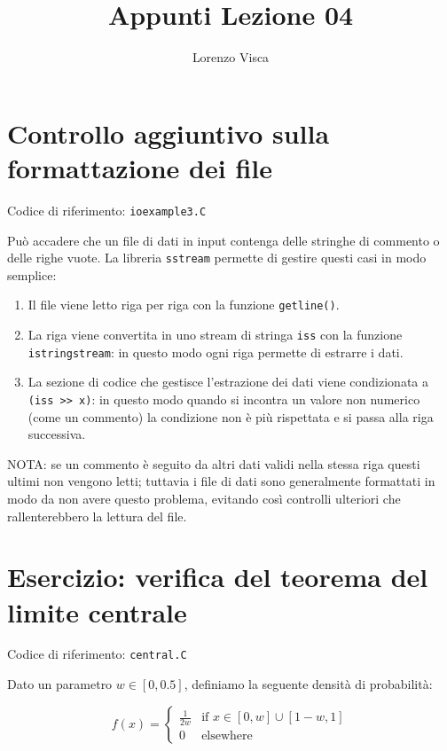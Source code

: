 \documentclass[10pt]{article}
\title{Appunti Lezione 04}
\author{Lorenzo Visca}
\date{}
\newcommand{\ttt}{\texttt}
\begin{document}
\maketitle

\section{Controllo aggiuntivo sulla formattazione dei file}
Codice di riferimento: \ttt{ioexample3.C} \vspace{10pt}

Può accadere che un file di dati in input contenga delle stringhe di commento o delle righe vuote.
La libreria \ttt{sstream} permette di gestire questi casi in modo semplice:

\begin{enumerate}
    \item Il file viene letto riga per riga con la funzione \ttt{getline()}.
    \item La riga viene convertita in uno stream di stringa \ttt{iss} con la funzione \ttt{istringstream}: in questo modo ogni riga permette di estrarre i dati.
    \item La sezione di codice che gestisce l'estrazione dei dati viene condizionata a \ttt{(iss >> x)}: in questo modo
          quando si incontra un valore non numerico (come un commento) la condizione non è più rispettata e si passa alla riga successiva.
    
\end{enumerate}

NOTA: se un commento è seguito da altri dati validi nella stessa riga questi ultimi non vengono letti;
tuttavia i file di dati sono generalmente formattati in modo da non avere questo problema,
evitando così controlli ulteriori che rallenterebbero la lettura del file.

\section{Esercizio: verifica del teorema del limite centrale}
Codice di riferimento: \ttt{central.C} \vspace{10pt}

Dato un parametro \( w \in [0, 0.5] \), definiamo la seguente densità di probabilità:

\begin{equation}
f(x) = \begin{cases}
\frac{1}{2w} & \text{if } x \in [0,w]\cup[1-w,1] \\
0 & \text{elsewhere}
\end{cases}
\label{eq:dist_w}
\end{equation}
\end{document}

